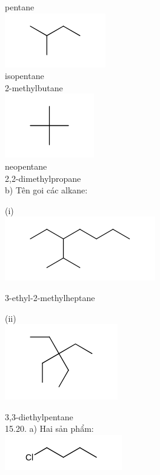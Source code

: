 \documentclass[10pt]{article}
\begin{document}
pentane\\
\includegraphics{smile-8d344d449d9937686169dea673073c9d5488b778}\\
isopentane\\
2-methylbutane\\
\includegraphics{smile-97b5d12e87770889267767a0401ba276a36f3d65}\\
neopentane\\
2,2-dimethylpropane\\
b) Tên goi các alkane:

(i)\\
\includegraphics{smile-96d47cbf41c264311a8cee82b56cd0ad84646f9c}

3-ethyl-2-methylheptane

(ii)\\
\includegraphics{smile-13a4f1e9f8f6f77e005c0033b736234a9ddcd9aa}

3,3-diethylpentane\\
15.20. a) Hai sản phẩm:\\
\includegraphics{smile-fa8f3c6d0bd90a5e1d39b2fc80aa4f8ff132068c}
\end{document}
